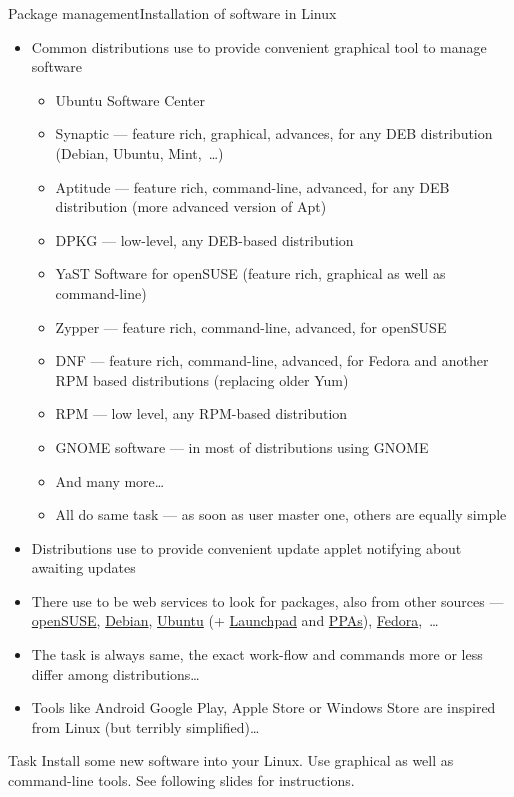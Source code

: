 \documentclass[compress, xelatex, 11pt, xcolor=svgnames, aspectratio=169, url={hyphens, lowtilde}]{beamer}
\begin{document}
\begin{frame}[allowframebreaks]{Package management}{Installation of software in Linux}
\begin{itemize}
		\item Common distributions use to provide convenient graphical tool to manage software
		\begin{itemize}
			\item Ubuntu Software Center
			\item Synaptic --- feature rich, graphical, advances, for any DEB distribution (Debian, Ubuntu, Mint,~\ldots)
			\item Aptitude --- feature rich, command-line, advanced, for any DEB distribution (more advanced version of Apt)
			\item DPKG --- low-level, any DEB-based distribution
			\item YaST Software for openSUSE (feature rich, graphical as well as command-line)
			\item Zypper --- feature rich, command-line, advanced, for openSUSE
			\item DNF --- feature rich, command-line, advanced, for Fedora and another RPM based distributions (replacing older Yum)
			\item RPM --- low level, any RPM-based distribution
			\item GNOME software --- in most of distributions using GNOME
			\item And many more\ldots
			\item All do same task --- as soon as user master one, others are equally simple
		\end{itemize}
		\item Distributions use to provide convenient update applet notifying about awaiting updates
		\item There use to be web services to look for packages, also from other sources --- \href{https://software.opensuse.org/explore}{openSUSE}, \href{https://www.debian.org/distrib/packages\#search_packages}{Debian}, \href{https://packages.ubuntu.com/}{Ubuntu} (+ \href{https://launchpad.net/ubuntu/+search}{Launchpad} and \href{https://launchpad.net/ubuntu/+ppas}{PPAs}), \href{https://packages.fedoraproject.org/}{Fedora},~\ldots
		\item The task is always same, the exact work-flow and commands more or less differ among distributions\ldots
		\item Tools like Android Google Play, Apple Store or Windows Store are inspired from Linux (but terribly simplified)\ldots
	\end{itemize}
	\vfill
	\begin{block}{Task}
		Install some new software into your Linux. Use graphical as well as command-line tools. See following slides for instructions.
	\end{block}
\end{frame}
\end{document}
